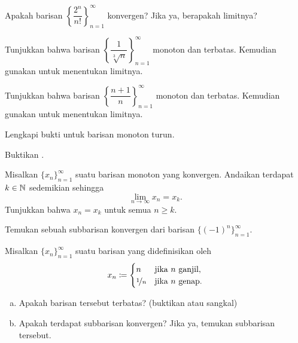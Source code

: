 \begin{exercise}
Apakah barisan
$\left\{ \dfrac{2^n}{n!} \right\}_{n=1}^\infty$
konvergen?  Jika ya, berapakah limitnya?
\end{exercise}

\begin{exercise}
Tunjukkan bahwa barisan
$\left\{ \dfrac{1}{\sqrt[3]{n}} \right\}_{n=1}^\infty$ monoton dan terbatas.  Kemudian gunakan
 untuk menentukan limitnya.
\end{exercise}

\begin{exercise}
Tunjukkan bahwa barisan
$\left\{ \dfrac{n+1}{n} \right\}_{n=1}^\infty$
monoton dan terbatas.  Kemudian gunakan
 untuk menentukan limitnya.
\end{exercise}

\begin{exercise}
Lengkapi bukti  untuk barisan
monoton turun.
\end{exercise}

\begin{exercise}
Buktikan .
\end{exercise}

\begin{exercise}
Misalkan $\{ x_n \}_{n=1}^\infty$ suatu barisan monoton yang konvergen.  Andaikan
terdapat $k \in {\mathbb{N}}$ sedemikian sehingga
\begin{equation*}
\lim_{n\to \infty} x_n = x_k .
\end{equation*}
Tunjukkan bahwa $x_n = x_k$ untuk semua $n \geq k$.
\end{exercise}

\begin{exercise}
\pagebreak[2]
Temukan sebuah subbarisan konvergen dari barisan
$\bigl\{ {(-1)}^n \bigr\}_{n=1}^\infty$.
\end{exercise}

\begin{exercise}
Misalkan $\{x_n\}_{n=1}^\infty$ suatu barisan yang didefinisikan oleh
\begin{equation*}
x_n \coloneqq 
\begin{cases}
n               & \text{jika } n \text{ ganjil} , \\
\nicefrac{1}{n} & \text{jika } n \text{ genap} .
\end{cases}
\avoidbreak
\end{equation*}
\begin{enumerate}[a)]
\item Apakah barisan tersebut terbatas? (buktikan atau sangkal)
\item Apakah terdapat subbarisan konvergen?  Jika ya, temukan subbarisan tersebut.
\end{enumerate}
\end{exercise}

